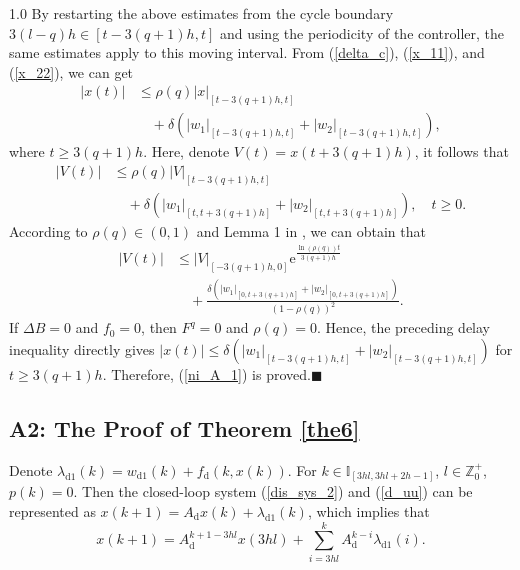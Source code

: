 \documentclass[journal]{IEEEtran}
\begin{document}
\begin{spacing}{1.0}
By restarting the above estimates from the cycle boundary $3(l-q)h\in[t-3(q+1)h,t]$ and using the periodicity of the controller, the same estimates apply to this moving interval. From (\ref{delta_c}), (\ref{x_11}), and (\ref{x_22}), we can get
\begin{align}
\left\vert x(t)\right\vert
&\leq\rho(q)\left\vert x\right\vert
_{[t-3(q+1)h,t]}\nonumber\\
&\quad+\delta\left(
\left\vert w_{1}\right\vert _{[t-3(q+1)h,t]}
+\left\vert w_{2}\right\vert _{[t-3(q+1)h,t]}\right),
\end{align}
where $t\geq3(q+1)h$. Here, denote
$V(t)=x(t+3(q+1)h)$, it follows that
\begin{align}
\left\vert V(t)\right\vert
&\leq\rho(q)\left\vert V\right\vert
_{[t-3(q+1)h,t]}\nonumber\\
&\quad+\delta\left({
\left\vert w_{1}\right\vert _{[t,t+3(q+1)h]}
+\left\vert w_{2}\right\vert _{[t,t+3(q+1)h]}}\right),\quad t\geq0.
\end{align}
According to $\rho(q)\in(0,1)$ and Lemma 1 in
\cite{Mazen14tac}, we can obtain that
\begin{align}
\left\vert V(t)\right\vert
&\leq\left\vert V\right\vert_{[-3(q+1)h,0]}
\mathrm{e}^{\frac{\ln\left({\rho(q)}\right)t}
{3(q+1)h}}\nonumber\\
&\quad+\frac{\delta\left({
\left\vert w_{1}\right\vert _{[0,t+3(q+1)h]}
+\left\vert w_{2}\right\vert _{[0,t+3(q+1)h]}}\right)}
{\left(1-\rho(q)\right)^{2}}.
\end{align}
If $\mathit{\Delta}B=0$ and $f_{0}=0$, then $F^{q}=0$ and $\rho(q)=0$. Hence, the preceding delay inequality directly gives $|x(t)|\leq\delta(|w_{1}|_{[t-3(q+1)h,t]}+|w_{2}|_{[t-3(q+1)h,t]})$ for $t\geq3(q+1)h$.
Therefore, (\ref{ni_A_1}) is proved.\hfill$\blacksquare$

\subsection*{A2: The Proof of Theorem \ref{the6}}

Denote $\lambda_{\mathrm{d}1}(k)=w_{\mathrm{d}1}(k)+f_{\mathrm{d}}(k,x(k))$.
For $k\in\mathbb{I}_{[3hl,3hl+2h-1]}$, $l\in%
\mathbb{Z}
_{0}^{+}$, $p(k)=0$. Then the closed-loop system (\ref{dis_sys_2}) and
(\ref{d_uu}) can be represented as
$x(k+1)=A_{\mathrm{d}}x(k)+\lambda_{\mathrm{d}1}(k)$,
which implies that
\begin{equation}
x(k+1)=A_{\mathrm{d}}^{k+1-3hl}x(3hl)+%
{\displaystyle\sum_{i=3hl}^{k}}
A_{\mathrm{d}}^{k-i}\lambda_{\mathrm{d}1}(i). \label{x_k11}%
\end{equation}



\end{spacing}
\end{document}
